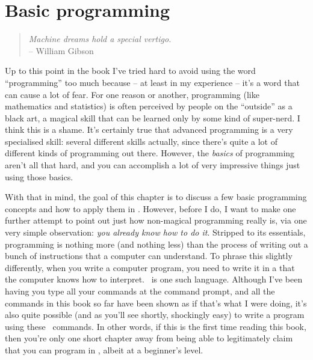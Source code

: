 

\chapter{Basic programming~\label{ch:scripting}}

\begin{quote}
{\it Machine dreams hold a special vertigo.} \\
\hspace*{2cm}-- William Gibson
\end{quote}

\noindent
Up to this point in the book I've tried hard to avoid using the word ``programming'' too much because -- at least in my experience -- it's a word that can cause a lot of fear. For one reason or another, programming (like mathematics and statistics) is often perceived by people on the ``outside'' as a black art, a magical skill that can be learned only by some kind of super-nerd. I think this is a shame. It's certainly true that advanced programming is a very specialised skill: several different skills actually, since there's quite a lot of different kinds of programming out there. However, the {\it basics} of programming aren't all that hard, and you can accomplish a lot of very impressive things just using those basics. 

With that in mind, the goal of this chapter is to discuss a few basic programming concepts and how to apply them in \R. However, before I do, I want to make one further attempt to point out just how non-magical programming really is, via one very simple observation: {\it you already know how to do it}. Stripped to its essentials, programming is nothing more (and nothing less) than the process of writing out a bunch of instructions that a computer can understand. To phrase this slightly differently, when you write a computer program, you need to write it in a  that the computer knows how to interpret. \R\ is one such language. Although I've been having you type all your commands at the command prompt, and all the commands in this book so far have been shown as if that's what I were doing, it's also quite possible (and as you'll see shortly, shockingly easy) to write a program using these \R\ commands. In other words, if this is the first time reading this book, then you're only one short chapter away from being able to legitimately claim that you can program in \R, albeit at a beginner's level.    



